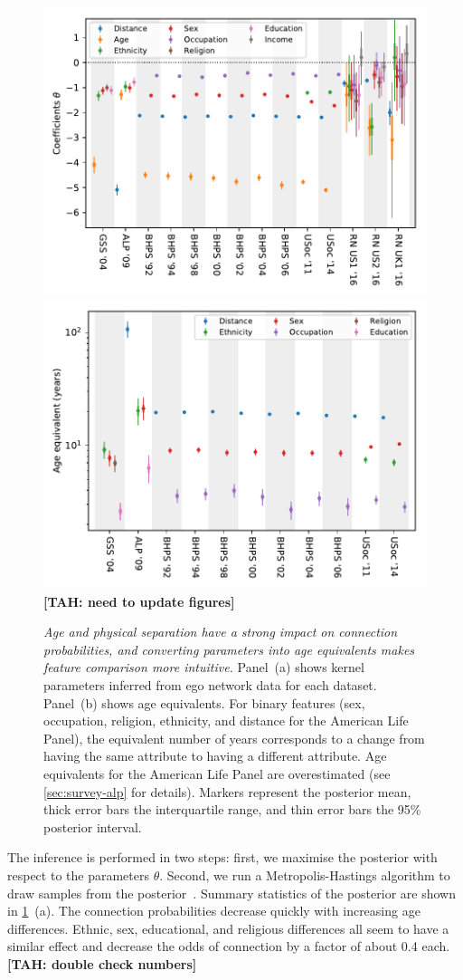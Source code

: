 \documentclass{scrartcl}
\newcommand{\titlecaption}[2]{\caption[#1]{\emph{#1} #2}}
\newcommand{\tah}[1]{\textbf{[TAH: #1]}}
\begin{document}
\begin{figure}
    \includegraphics[width=.6\columnwidth]{survey-coefficients}
    \includegraphics[width=.6\columnwidth]{survey-age-equivalent}
    \tah{need to update figures}
    \titlecaption{Age and physical separation have a strong impact on connection probabilities, and converting parameters into age equivalents makes feature comparison more intuitive.}{
    Panel~(a) shows kernel parameters inferred from ego network data for each dataset.
    Panel~(b) shows age equivalents. For binary features (sex, occupation, religion, ethnicity, and distance for the American Life Panel), the equivalent number of years corresponds to a change from having the same attribute to having a different attribute. Age equivalents for the American Life Panel are overestimated (see \cref{sec:survey-alp} for details).
    Markers represent the posterior mean, thick error bars the interquartile range, and thin error bars the 95\% posterior interval.\label{fig:parameters-and-age-equivalents}}
\end{figure}

The inference is performed in two steps: first, we maximise the posterior with respect to the parameters $\theta$. Second, we run a Metropolis-Hastings algorithm to draw samples from the posterior~\cite{Hastings1970}. Summary statistics of the posterior are shown in \cref{fig:parameters-and-age-equivalents}~(a). The connection probabilities decrease quickly with increasing age differences. Ethnic, sex, educational, and religious differences all seem to have a similar effect and decrease the odds of connection by a factor of about 0.4 each.\tah{double check numbers}
\end{document}
